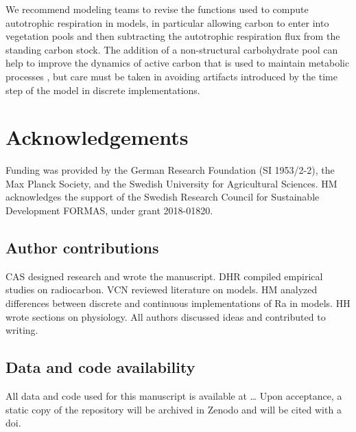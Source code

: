 \documentclass[12pt, a4paper]{article}
\begin{document}
We recommend modeling teams to revise the functions used to compute autotrophic respiration in models, in particular allowing carbon to enter into vegetation pools and then subtracting the autotrophic respiration flux from the standing carbon stock. The addition of a non-structural carbohydrate pool can help to improve the dynamics of active carbon that is used to maintain metabolic processes \citep{Herrera2020}, but care must be taken in avoiding artifacts introduced by the time step of the model in discrete implementations. 


\section*{Acknowledgements}
Funding was provided by the German Research Foundation (SI 1953/2-2), the Max Planck Society, and the Swedish University for Agricultural Sciences. HM acknowledges the support of the Swedish Research Council for Sustainable Development FORMAS, under grant 2018-01820.

\subsection*{Author contributions}
CAS designed research and wrote the manuscript. DHR compiled empirical studies on radiocarbon. VCN reviewed literature on models. HM analyzed differences between discrete and continuous implementations of Ra in models. HH wrote sections on physiology. All authors discussed ideas and contributed to writing.

\subsection*{Data and code availability}
All data and code used for this manuscript is available at \dots
Upon acceptance, a static copy of the repository will be archived in Zenodo and will be cited with a doi. 



\end{document}
